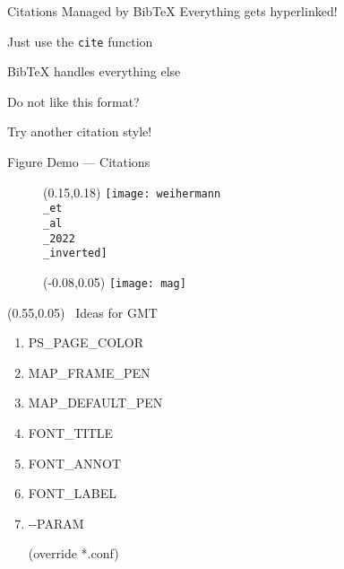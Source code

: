 \documentclass[dark]{cgem-presentation}
\begin{document}
  \begin{frame}{Citations Managed by Bib\TeX}
    \LARGE
    Everything gets hyperlinked! %
    { \itshape
      \small
      \cite{doi:10.1190/1.1444302}
    }
    \vspace{2mm}

    Just use the \texttt{cite} function %
    { \itshape
      \small
      \cite{doi:10.1190/image2022-3729385.1}
    }
    \vspace{2mm}
    
    Bib\TeX{} handles everything else
    \vspace{1cm}
    
    Do not like this format?

    Try another citation style! %
    { \itshape
      \small
      \cite{doi:10.1190/geo2020-0729.1}
    }

  \end{frame}

  \begin{frame}{Figure Demo --- Citations}
    \begin{figure}
      \begin{textblock*}{0.7\paperwidth}(0.15\paperwidth,0.18\paperheight)
        \texttt{[image: weihermann\\\_et\\\_al\\\_2022\\\_inverted]}
      \end{textblock*}
    \end{figure}

  \end{frame}

  \begin{frame}
    \begin{figure}
      \begin{textblock*}{0.7\paperwidth}(-0.08\paperwidth,0.05\paperheight)
        \texttt{[image: mag]}
      \end{textblock*}
    \end{figure}
    \begin{textblock*}{0.5\paperwidth}(0.55\paperwidth,0.05\paperheight)
      \Huge
      \,\,\,Ideas for GMT
      \begin{enumerate}
        \item PS\_PAGE\_COLOR
        \item MAP\_FRAME\_PEN
        \item MAP\_DEFAULT\_PEN
        \item FONT\_TITLE
        \item FONT\_ANNOT
        \item FONT\_LABEL
        \item -\hspace{0.1mm}-PARAM

          (override *.conf)
      \end{enumerate}
    \end{textblock*}

  \end{frame}
\end{document}
